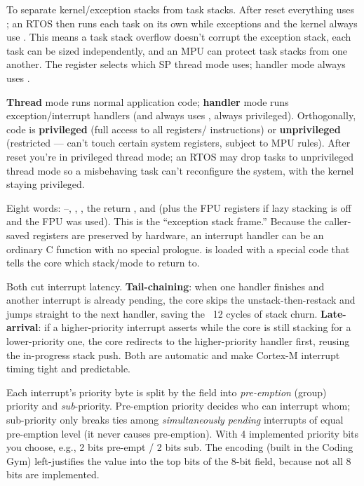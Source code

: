 To separate kernel/exception stacks from task stacks. After reset everything
uses ; an RTOS then runs each task on its own  while
exceptions and the kernel always use . This means a task stack
overflow doesn't corrupt the exception stack, each task can be sized
independently, and an MPU can protect task stacks from one another. The
 register selects which SP thread mode uses; handler mode always
uses .

\textbf{Thread} mode runs normal application code; \textbf{handler} mode runs
exception/interrupt handlers (and always uses , always privileged).
Orthogonally, code is \textbf{privileged} (full access to all registers/
instructions) or \textbf{unprivileged} (restricted --- can't touch certain
system registers, subject to MPU rules). After reset you're in privileged
thread mode; an RTOS may drop tasks to unprivileged thread mode so a misbehaving
task can't reconfigure the system, with the kernel staying privileged.

Eight words: --, , , the return
, and  (plus the FPU registers if lazy stacking is off and
the FPU was used). This is the ``exception stack frame.'' Because the
caller-saved registers are preserved by hardware, an interrupt handler can be
an ordinary C function with no special prologue.  is loaded with a
special  code that tells the core which stack/mode to return
to.

Both cut interrupt latency. \textbf{Tail-chaining}: when one handler finishes
and another interrupt is already pending, the core skips the
unstack-then-restack and jumps straight to the next handler, saving the ~12
cycles of stack churn. \textbf{Late-arrival}: if a higher-priority interrupt
asserts while the core is still stacking for a lower-priority one, the core
redirects to the higher-priority handler first, reusing the in-progress stack
push. Both are automatic and make Cortex-M interrupt timing tight and
predictable.

Each interrupt's priority byte is split by the  field into
\emph{pre-emption} (group) priority and \emph{sub}-priority. Pre-emption
priority decides who can interrupt whom; sub-priority only breaks ties among
\emph{simultaneously pending} interrupts of equal pre-emption level (it never
causes pre-emption). With 4 implemented priority bits you choose, e.g., 2 bits
pre-empt / 2 bits sub. The encoding (built in the Coding Gym) left-justifies
the value into the top bits of the 8-bit field, because not all 8 bits are
implemented.

